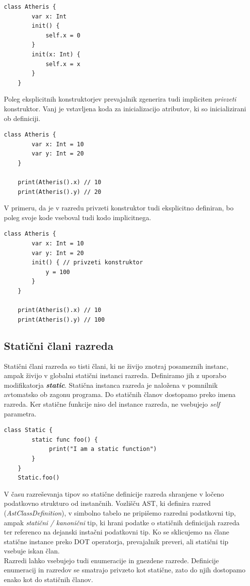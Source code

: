\documentclass[a4paper, 12p]{book}
\begin{document}
\begin{lstlisting}[caption={Konsturktorji}, captionpos=b]
	class Atheris {
	    var x: Int
	    init() {
	        self.x = 0
	    }
	    init(x: Int) {
	        self.x = x
	    }
	}
\end{lstlisting}

\indent Poleg eksplicitnih konstruktorjev prevajalnik zgenerira tudi impliciten \textit{privzeti} konstruktor. Vanj je vstavljena koda za inicializacijo atributov, ki so inicializirani ob definiciji. 

\begin{lstlisting}[caption={Implicitni privzeti konstruktor}, captionpos=b]
	class Atheris {
	    var x: Int = 10
	    var y: Int = 20
	}
	
	print(Atheris().x) // 10
	print(Atheris().y) // 20
\end{lstlisting}

V primeru, da je v razredu privzeti konstruktor tudi eksplicitno definiran, bo poleg svoje kode vseboval tudi kodo implicitnega.

\begin{lstlisting}[caption={Eksplicitni privzeti konstruktor}, captionpos=b]
	class Atheris {
	    var x: Int = 10
	    var y: Int = 20
	    init() { // privzeti konstruktor
	        y = 100
	    }
	}
	
	print(Atheris().x) // 10
	print(Atheris().y) // 100
\end{lstlisting}

\subsection{Statični člani razreda}

Statični člani razreda so tisti člani, ki ne živijo znotraj posameznih instanc, ampak živijo v globalni statični instanci razreda. Definiramo jih z uporabo modifikatorja \textit{\textbf{static}}. Statična instanca razreda je naložena v pomnilnik avtomatsko ob zagonu programa. Do statičnih članov dostopamo preko imena razreda. Ker statične funkcije niso del instance razreda, ne vsebujejo \textit{self} parametra.

\begin{lstlisting}[caption={Klicanje statične funkcije}, captionpos=b]
	class Static {
   	    static func foo() {
	         print("I am a static function")
	    }
	} 
	Static.foo()
\end{lstlisting}

\indent V času razreševanja tipov so statične definicije razreda shranjene v ločeno podatkovno strukturo od instančnih. Vozlišču AST, ki definira razred (\textit{AstClassDefinition}), v simbolno tabelo ne pripišemo razredni podatkovni tip, ampak \textit{statični / kanonični} tip, ki hrani podatke o statičnih definicijah razreda ter referenco na dejanski instačni podatkovni tip. Ko se sklicujemo na člane statične instance preko DOT operatorja, prevajalnik preveri, ali statični tip vsebuje iskan član.\\
\indent Razredi lahko vsebujejo tudi enumeracije in gnezdene razrede. Definicije enumeracij in razredov se smatrajo privzeto kot statične, zato do njih dostopamo enako kot do statičnih članov. 
\end{document}
